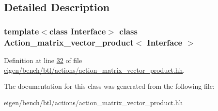 \subsection{Detailed Description}
\subsubsection*{template$<$class Interface$>$\newline
class Action\+\_\+matrix\+\_\+vector\+\_\+product$<$ Interface $>$}



Definition at line \hyperlink{eigen_2bench_2btl_2actions_2action__matrix__vector__product_8hh_source_l00032}{32} of file \hyperlink{eigen_2bench_2btl_2actions_2action__matrix__vector__product_8hh_source}{eigen/bench/btl/actions/action\+\_\+matrix\+\_\+vector\+\_\+product.\+hh}.



The documentation for this class was generated from the following file\+:\begin{DoxyCompactItemize}
\item 
eigen/bench/btl/actions/action\+\_\+matrix\+\_\+vector\+\_\+product.\+hh\end{DoxyCompactItemize}
